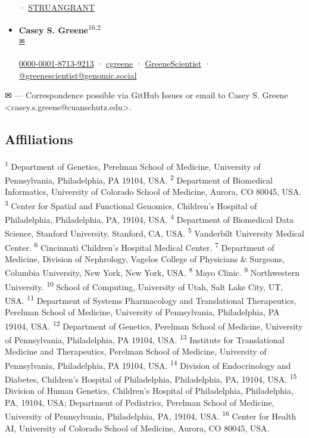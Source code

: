 \documentclass[
  a4paper,
]{article}
\begin{document}
\begin{itemize}
  · 
  \href{https://twitter.com/STRUANGRANT}{STRUANGRANT}
\item
  \textbf{Casey S. Greene}\textsuperscript{16,2} \\
  \textsuperscript{\protect\hyperlink{correspondence}{✉}}
  
  \href{https://orcid.org/0000-0001-8713-9213}{0000-0001-8713-9213}
  · 
  \href{https://github.com/cgreene}{cgreene}
  · 
  \href{https://twitter.com/GreeneScientist}{GreeneScientist}
  · 
  \href{https://genomic.social/@greenescientist}{@greenescientist@genomic.social}
\end{itemize}

\leavevmode{}%
✉ --- Correspondence possible via GitHub Issues
or email to
Casey S. Greene \textless casey.s.greene@cuanschutz.edu\textgreater.

\hypertarget{affiliations}{%
\subsection{Affiliations}\label{affiliations}}

\textsuperscript{1} Department of Genetics, Perelman School of Medicine, University of Pennsylvania, Philadelphia, PA 19104, USA.
\textsuperscript{2} Department of Biomedical Informatics, University of Colorado School of Medicine, Aurora, CO 80045, USA.
\textsuperscript{3} Center for Spatial and Functional Genomics, Children's Hospital of Philadelphia, Philadelphia, PA, 19104, USA.
\textsuperscript{4} Department of Biomedical Data Science, Stanford University, Stanford, CA, USA.
\textsuperscript{5} Vanderbilt University Medical Center.
\textsuperscript{6} Cincinnati Children's Hospital Medical Center.
\textsuperscript{7} Department of Medicine, Division of Nephrology, Vagelos College of Physicians \& Surgeons, Columbia University, New York, New York, USA.
\textsuperscript{8} Mayo Clinic.
\textsuperscript{9} Northwestern University.
\textsuperscript{10} School of Computing, University of Utah, Salt Lake City, UT, USA.
\textsuperscript{11} Department of Systems Pharmacology and Translational Therapeutics, Perelman School of Medicine, University of Pennsylvania, Philadelphia, PA 19104, USA.
\textsuperscript{12} Department of Genetics, Perelman School of Medicine, University of Pennsylvania, Philadelphia, PA 19104, USA.
\textsuperscript{13} Institute for Translational Medicine and Therapeutics, Perelman School of Medicine, University of Pennsylvania, Philadelphia, PA 19104, USA.
\textsuperscript{14} Division of Endocrinology and Diabetes, Children's Hospital of Philadelphia, Philadelphia, PA, 19104, USA.
\textsuperscript{15} Division of Human Genetics, Children's Hospital of Philadelphia, Philadelphia, PA, 19104, USA; Department of Pediatrics, Perelman School of Medicine, University of Pennsylvania, Philadelphia, PA, 19104, USA.
\textsuperscript{16} Center for Health AI, University of Colorado School of Medicine, Aurora, CO 80045, USA.
\end{document}
